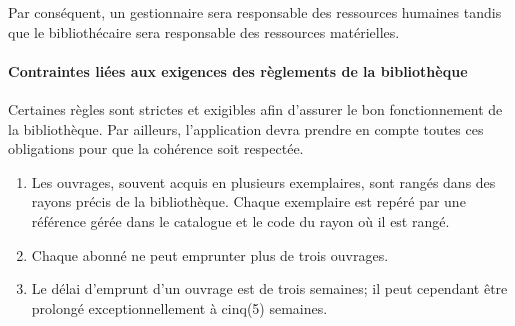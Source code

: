 Par conséquent, un gestionnaire sera responsable des ressources humaines tandis que
le bibliothécaire sera responsable des ressources matérielles.
    
\paragraph{Contraintes liées aux exigences des règlements de la bibliothèque}
Certaines règles sont strictes et exigibles afin d’assurer le bon fonctionnement 
de la bibliothèque. Par ailleurs, l’application devra prendre en compte toutes
 ces obligations pour que la cohérence soit respectée. \par
 \begin{enumerate}
     \item Les ouvrages, souvent acquis en plusieurs exemplaires, sont 
     rangés dans des rayons précis de la bibliothèque. Chaque exemplaire est repéré 
     par une référence gérée dans le catalogue et le code du rayon où il est rangé.
     \item Chaque abonné ne peut emprunter plus de trois ouvrages.
     \item Le délai d’emprunt d’un ouvrage est de trois semaines; il peut 
     cependant être prolongé exceptionnellement à cinq(5) semaines.
 \end{enumerate}